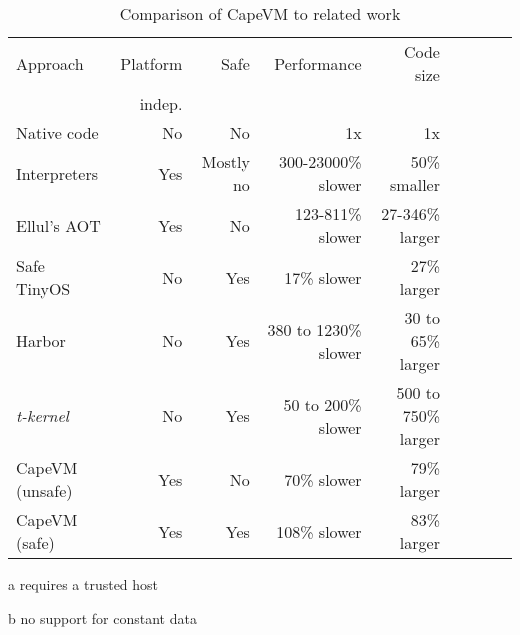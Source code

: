 \begin{table}
\caption{Comparison of CapeVM to related work}
\label{tbl-contribution-comparison}
    \begin{threeparttable}
    \begin{tabular}{lrrrrrrrr} %
    \toprule
    Approach          & Platform    & Safe               & Performance           & Code size                  \\
                      & indep.      &                    &                       &                            \\
    \midrule
    \midrule
    Native code       & No          & No                 & 1x                    & 1x                         \\
    Interpreters      & Yes         & Mostly no          & 300-23000\% slower    & ~50\% smaller \tnote{b}    \\ 
    Ellul's AOT       & Yes         & No                 & 123-811\% slower      & 27-346\% larger \tnote{b}  \\
    Safe TinyOS       & No          & Yes \tnote{a}      & 17\% slower           & 27\% larger                \\
    Harbor            & No          & Yes                & 380 to 1230\% slower  & 30 to 65\% larger          \\
    \emph{t-kernel}   & No          & Yes                & 50 to 200\% slower    & 500 to 750\% larger        \\
    CapeVM (unsafe)   & Yes         & No                 & 70\% slower           & 79\% larger                \\ %
    CapeVM (safe)     & Yes         & Yes                & 108\% slower          & 83\% larger                \\ %
    \bottomrule
    \end{tabular}
    \begin{tablenotes}
        \item[a] requires a trusted host
        \item[b] no support for constant data
    \end{tablenotes}
    \end{threeparttable}
\end{table}
